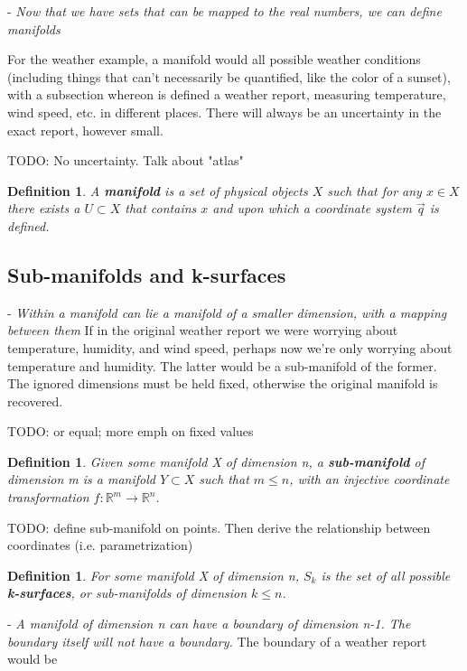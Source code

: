 \documentclass{book}
\newtheorem{defn}[equation]{Definition}
\begin{document}
- \emph{Now that we have sets that can be mapped to the real numbers, we can define manifolds}

For the weather example, a manifold would all possible weather conditions (including things that can't necessarily be quantified, like the color of a sunset), with a subsection whereon is defined a weather report, measuring temperature, wind speed, etc. in different places. There will always be an uncertainty in the exact report, however small.  

TODO: No uncertainty. Talk about "atlas"
 
\begin{defn}
	A \textbf{manifold} is a set of physical objects $X$ such that for any $x \in X$ there exists a $U \subset X$ that contains $x$ and upon which a coordinate system $\vec{q}$ is defined.
\end{defn}




\subsection{Sub-manifolds and k-surfaces}

- \emph{Within a manifold can lie a manifold of a smaller dimension, with a mapping between them}
If in the original weather report we were worrying about temperature, humidity, and wind speed, perhaps now we're only worrying about temperature and humidity. The latter would be a sub-manifold of the former. 
The ignored dimensions must be held fixed, otherwise the original manifold is recovered. 

TODO: or equal; more emph on fixed values

\begin{defn}
	Given some manifold X of dimension n, a \textbf{sub-manifold} of dimension m is a manifold $Y \subset X$ such that $m \leq n$, with an injective coordinate transformation $f: \mathbb{R}^m \to \mathbb{R}^n$. 
\end{defn}

TODO: define sub-manifold on points. Then derive the relationship between coordinates (i.e. parametrization)


\begin{defn}
	For some manifold X of dimension n, $S_k$ is the set of all possible \textbf{k-surfaces}, or sub-manifolds of dimension $k \leq n$. 
\end{defn}

- \emph{A manifold of dimension n can have a boundary of dimension n-1. The boundary itself will not have a boundary.}
The boundary of a weather report would be 
\end{document}
